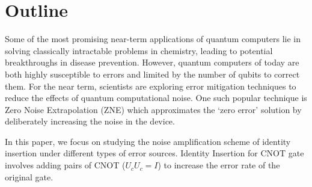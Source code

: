 \section{Outline} \label{sec:outline}

Some of the most promising near-term applications of quantum computers lie in solving classically intractable problems in chemistry, leading to potential breakthroughs in disease prevention. However, quantum computers of today are both highly susceptible to errors and limited by the number of qubits to correct them. For the near term, scientists are exploring error mitigation techniques to reduce the effects of quantum computational noise. One such popular technique is Zero Noise Extrapolation (ZNE) which approximates the ‘zero error’ solution by deliberately increasing the noise in the device.

In this paper, we focus on studying the noise amplification scheme of identity
insertion under different types of error sources. Identity Insertion for CNOT gate involves adding pairs of CNOT (\(U_c U_c = I\)) to increase the error rate of the original gate. 
